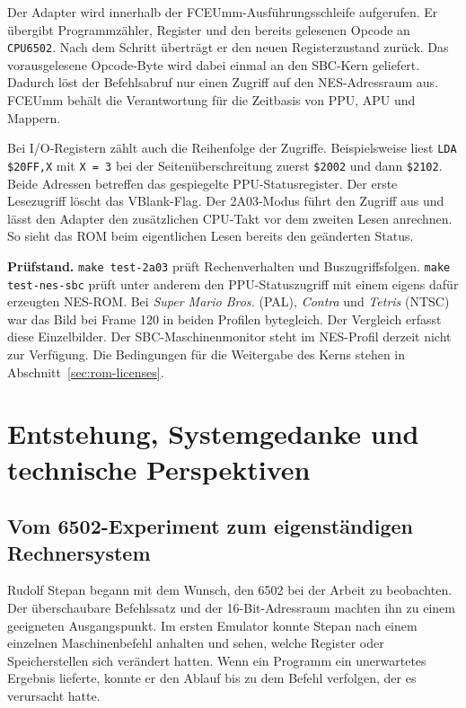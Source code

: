 \documentclass[fontsize=10.2bp,DIV=calc,oneside,open=any,headings=normal,numbers=noenddot]{scrbook}
\begin{document}
Der Adapter wird innerhalb der FCEUmm-Ausführungsschleife aufgerufen.
Er übergibt Programmzähler, Register und den bereits gelesenen Opcode
an \texttt{CPU6502}. Nach dem Schritt überträgt er den neuen
Registerzustand zurück. Das vorausgelesene Opcode-Byte wird dabei
einmal an den SBC-Kern geliefert. Dadurch löst der Befehlsabruf nur
einen Zugriff auf den NES-Adressraum aus. FCEUmm behält die Verantwortung
für die Zeitbasis von PPU, APU und Mappern.

Bei I/O-Registern zählt auch die Reihenfolge der Zugriffe. Beispielsweise
liest \texttt{LDA \$20FF,X} mit \texttt{X = 3} bei der
Seitenüberschreitung zuerst \texttt{\$2002} und dann \texttt{\$2102}.
Beide Adressen betreffen das gespiegelte PPU-Statusregister. Der erste
Lesezugriff löscht das VBlank-Flag. Der 2A03-Modus führt den Zugriff
aus und lässt den Adapter den zusätzlichen CPU-Takt vor dem zweiten
Lesen anrechnen. So sieht das ROM beim eigentlichen Lesen bereits den
geänderten Status.

\textbf{Prüfstand.} \texttt{make test-2a03} prüft Rechenverhalten und
Buszugriffsfolgen. \texttt{make test-nes-sbc} prüft unter anderem den
PPU-Statuszugriff mit einem eigens dafür erzeugten NES-ROM. Bei
\emph{Super Mario Bros.} (PAL), \emph{Contra} und \emph{Tetris} (NTSC)
war das Bild bei Frame 120 in beiden Profilen bytegleich. Der Vergleich
erfasst diese Einzelbilder. Der SBC-Maschinenmonitor steht im
NES-Profil derzeit nicht zur Verfügung. Die Bedingungen für die
Weitergabe des Kerns stehen in Abschnitt~\ref{sec:rom-licenses}.

\chapter{Entstehung, Systemgedanke und technische Perspektiven}\label{ch:system-concept}

\section{Vom 6502-Experiment zum eigenständigen Rechnersystem}

Rudolf Stepan begann mit dem Wunsch, den 6502 bei der Arbeit zu
beobachten. Der überschaubare Befehlssatz und der 16-Bit-Adressraum
machten ihn zu einem geeigneten Ausgangspunkt. Im ersten Emulator
konnte Stepan nach einem einzelnen Maschinenbefehl anhalten und sehen,
welche Register oder Speicherstellen sich verändert hatten. Wenn ein
Programm ein unerwartetes Ergebnis lieferte, konnte er den Ablauf
bis zu dem Befehl verfolgen, der es verursacht hatte.
\end{document}
